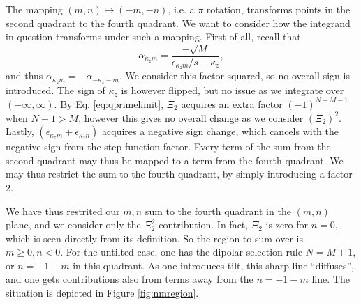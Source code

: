 The mapping \( (m,n) \mapsto (-m, -n) \), i.e. a \( \pi \) rotation, transforms points in the second quadrant to the fourth quadrant.
We want to consider how the integrand in question transforms under such a mapping.
First of all, recall that
\[
\alpha _{\kappa _z m} = \frac{-\sqrt{M} }{ \epsilon_{\kappa_z m} /s - \kappa _z},
\]
and thus \( \alpha _{\kappa _z m} = -\alpha _{-\kappa _z -m} \).
We consider this factor squared, so no overall sign is introduced.
The sign of \( \kappa_z  \) is however flipped, but no issue as we integrate over \( (-\infty, \infty) \).
By Eq. \eqref{eq:qprimelimit}, \( \Xi _2 \) acquires an extra factor \( (-1)^{N-M-1} \) when \( N-1 > M \), however this gives no overall change as we consider \( (\Xi_2) ^2 \).
Lastly, \( (\epsilon_{\kappa _z m} + \epsilon_{\kappa _z n}) \) acquires a negative sign change, which cancels with the negative sign from the step function factor.
Every term of the sum from the second quadrant may thus be mapped to a term from the fourth quadrant.
We may thus restrict the sum to the fourth quadrant, by simply introducing a factor 2.

We have thus restrited our \( m,n \) sum to the fourth quadrant in the \( (m,n) \) plane, and we consider only the \( \Xi _2^2 \) contribution.
In fact, \( \Xi _2 \) is zero for \( n=0 \), which is seen directly from its definition.
So the region to sum over is \( m \geq 0, n < 0 \).
For the untilted case, one has the dipolar  selection rule \( N = M + 1 \), or \( n = -1 -m \) in this quadrant.
As one introduces tilt, this sharp line ``diffuses'', and one gets contributions also from terms away from the \( n= -1 -m \) line.
The situation is depicted in Figure \ref{fig:nmregion}.


